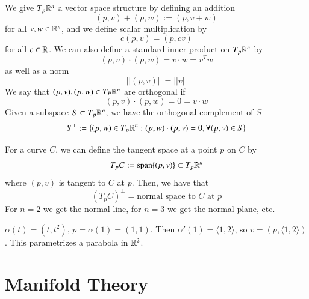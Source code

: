 \documentclass[12pt, a4paper, oneside, openright, titlepage]{book}
\begin{document}
\begin{rmk}
    We give $T_p\mathbb R^n$ a vector space structure by defining an addition \begin{equation}
        (p,v) + (p,w) := (p,v+w)
    \end{equation}
    for all $v,w \in \mathbb R^n$, and we define scalar multiplication by \begin{equation}
        c(p,v) = (p,cv)
    \end{equation}
    for all $c \in \mathbb R$. We can also define a standard inner product on $T_p\mathbb R^n$ by \begin{equation}
        (p,v) \cdot (p,w) = v\cdot w = v^Tw
    \end{equation}
    as well as a norm \begin{equation}
        ||(p,v)|| = ||v||
    \end{equation}
    We say that $(p,v),(p,w) \in T_P\mathbb R^n$ are orthogonal if \begin{equation}
        (p,v) \cdot (p,w) = 0 = v\cdot w
    \end{equation}
    Given a subspace $S \subset T_p\mathbb R^n$, we have the orthogonal complement of $S$ \begin{equation}
        S^{\perp} := \{(p,w) \in T_p\mathbb R^n: (p,w)\cdot (p,v) = 0,\forall (p,v) \in S\}
    \end{equation}
\end{rmk}


\begin{defn}
    For a curve $C$, we can define the tangent space at a point $p$ on $C$ by \begin{equation}
        T_pC := \operatorname{span}\{(p,v)\} \subset T_p\mathbb R^n
    \end{equation}
    where $(p,v)$ is tangent to $C$ at $p$. Then, we have that \begin{equation}
        (T_pC)^{\perp} = \text{normal space to $C$ at $p$}
    \end{equation}
    For $n = 2$ we get the normal line, for $n = 3$ we get the normal plane, etc.
\end{defn}

\begin{eg}
    $\alpha(t) = (t,t^2)$, $p = \alpha(1) = (1,1)$. Then $\alpha'(1) = \langle 1,2\rangle$, so $v = (p,\langle 1, 2\rangle)$. This parametrizes a parabola in $\mathbb R^2$.
\end{eg}


\part{Manifold Theory}
\end{document}

